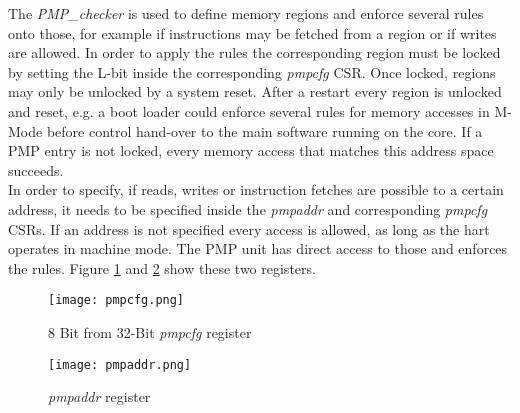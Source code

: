 The \textit{PMP\_checker} is used to define memory regions and enforce several rules onto
those, for example if instructions may be fetched from a region or if writes are
allowed. In order to apply the rules the corresponding region must be locked by
setting the L-bit inside the corresponding \textit{pmpcfg} \ac{CSR}. Once locked, regions may only be unlocked by a system reset. After a restart every region is unlocked and
reset, e.g. a boot loader could enforce several rules for memory accesses in M-Mode before control hand-over to the main software running on the core. If a \ac{PMP} entry is not locked, every memory access that matches this address space succeeds.
\\
In order to specify, if reads, writes or instruction fetches are possible to a certain address, it needs to be specified inside the \textit{pmpaddr} and corresponding \textit{pmpcfg} CSRs. If an address is not specified every access is allowed, as long as the hart operates in machine mode. The PMP unit has direct access to those and enforces the rules. Figure \ref{fig:pmpaddr} and \ref{fig:pmpcfg} show these two registers.\\

\begin{figure}[H]
	\centering
	\texttt{[image: pmpcfg.png]}
	\caption{8 Bit from 32-Bit \textit{pmpcfg} register \cite{riscv:privileged}}
	\label{fig:pmpaddr}
\end{figure}


\begin{figure}[H]
	\centering
	\texttt{[image: pmpaddr.png]}
	\caption{\textit{pmpaddr} register \cite{riscv:privileged}}
	\label{fig:pmpcfg}
\end{figure}

